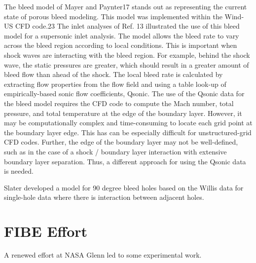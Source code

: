 \documentclass{article}
\begin{document}
The bleed model of Mayer and Paynter17 stands out as representing the current state of porous bleed modeling. This model was implemented within the Wind-US CFD code.23 The inlet analyses of Ref. 13 illustrated the use of this bleed model for a supersonic inlet analysis. The model allows the bleed rate to vary across the bleed region according to local conditions. This is important when shock waves are interacting with the bleed region. For example, behind the shock wave, the static pressures are greater, which should result in a greater amount of bleed flow than ahead of the shock. The local bleed rate is calculated by extracting flow properties from the flow field and using a table look-up of empirically-based sonic flow coefficients, Qsonic. The use of the Qsonic data for the bleed model requires the CFD code to compute the Mach number, total pressure, and total temperature at the edge of the boundary layer. However, it may be computationally complex and time-consuming to locate each grid point at the boundary layer edge. This has can be especially difficult for unstructured-grid CFD codes. Further, the edge of the boundary layer may not be well-defined, such as in the case of a shock / boundary layer interaction with extensive boundary layer separation. Thus, a different approach for using the Qsonic data is needed.






Slater \cite{Slater2009} developed a model for 90 degree bleed holes based on the Willis data for single-hole data where there is interaction between adjacent holes.


\section{FIBE Effort}

A renewed effort at NASA Glenn led to some experimental work. 
\end{document}
